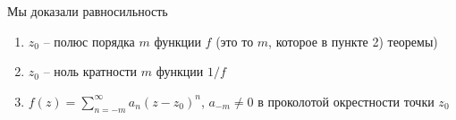 \begin{remark}\thmslashn
	
	Мы доказали равносильность 
	
	\begin{enumerate}
		\item 
		$z_0$ -- полюс порядка $m$ функции $f$ (это то $m$, которое в пункте 2) теоремы)
		
		\item 
		$z_0$ -- ноль кратности $m$ функции $1/f$
		
		\item
		$f(z) = \sum\limits_{n=-m}^\infty a_n(z - z_0)^n$, $a_{-m} \not = 0$ в проколотой окрестности точки $z_0$
		
	\end{enumerate}
	
\end{remark}
